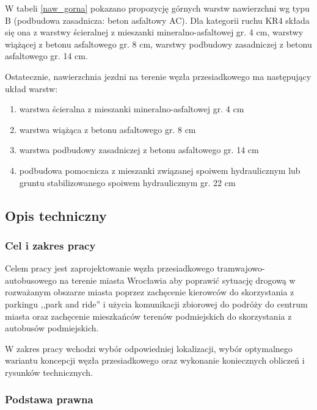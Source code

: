 \documentclass[twoside,12pt]{article}
\begin{document}
		W tabeli \ref{naw_gorna} pokazano propozycję górnych warstw nawierzchni wg typu B (podbudowa zasadnicza: beton asfaltowy AC). Dla kategorii ruchu KR4 składa się ona z warstwy ścieralnej z mieszanki mineralno-asfaltowej gr. 4 cm, warstwy wiążącej z betonu asfaltowego gr. 8 cm, warstwy podbudowy zasadniczej z betonu asfaltowego gr. 14 cm.
		
		Ostatecznie, nawierzchnia jezdni na terenie węzła przesiadkowego ma następujący układ warstw:
		\begin{enumerate}
		\item warstwa ścieralna z mieszanki mineralno-asfaltowej gr. 4 cm
		\item warstwa wiążąca z betonu asfaltowego gr. 8 cm
		\item warstwa podbudowy zasadniczej z betonu asfaltowego gr. 14 cm

		\item podbudowa pomocnicza z mieszanki związanej spoiwem hydraulicznym lub gruntu stabilizowanego spoiwem hydraulicznym gr. 22 cm
		\end{enumerate}
		
		\subsection{Opis techniczny}
		
		\subsubsection{Cel i zakres pracy}
		
		Celem pracy jest zaprojektowanie węzła przesiadkowego tramwajowo-autobusowego na terenie miasta Wrocławia aby poprawić sytuację drogową w rozważanym obszarze miasta poprzez zachęcenie kierowców do skorzystania z parkingu ,,park and ride'' i użycia komunikacji zbiorowej do podróży do centrum miasta oraz zachęcenie mieszkańców terenów podmiejskich do skorzystania z autobusów podmiejskich. 
		
		W zakres pracy wchodzi wybór odpowiedniej lokalizacji, wybór optymalnego wariantu koncepcji węzła przesiadkowego oraz wykonanie koniecznych obliczeń i rysunków technicznych. 
		
		\subsubsection{Podstawa prawna}
		
\end{document}
